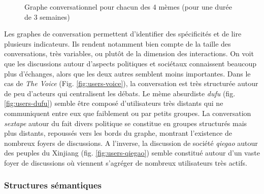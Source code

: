 \begin{figure}
{    }
    
  \caption{  
    Graphe conversationnel pour chacun des 4 m\`emes (pour une dur\'ee de 3 semaines)
  }
\end{figure}
\clearpage
Les graphes de conversation permettent d{\textquoteright}identifier des sp\'ecificit\'es et de lire plusieurs indicateurs. Ils rendent notamment bien compte de la taille des conversations, tr\`es variables, ou plut\^ot de la dimension des interactions. On voit que les discussions autour d{\textquoteright}aspects politiques et soci\'etaux connaissent beaucoup plus d{\textquoteright}\'echanges, alors que les deux autres semblent moins importantes. Dans le cas de \textit{The Voice} (Fig. \ref{fig:users-voice}), la conversation est tr\`es structur\'ee autour de peu d{\textquoteright}acteurs qui centralisent les d\'ebats. Le m\`eme absurdiste \textit{dufu} (fig. \ref{fig:users-dufu}) semble \^etre compos\'e d{\textquoteright}utilisateurs tr\`es distants qui ne communiquent entre eux que faiblement ou par petits groupes. La conversation \textit{sextape }autour du fait divers politique se constitue en groupes structur\'es mais plus distants, repouss\'es vers les bords du graphe, montrant l{\textquoteright}existence de nombreux foyers de discussions. A l{\textquoteright}inverse, la discussion de soci\'et\'e \textit{qiegao}\textit{ }autour des peuples du Xinjiang (fig. \ref{fig:users-qiegao}) semble constitu\'e autour d{\textquoteright}un vaste foyer de discussions o\`u viennent s{\textquoteright}agr\'eger de nombreux utilisateurs tr\`es actifs. 

\subsubsection[Structures s\'emantiques]{Structures s\'emantiques}

